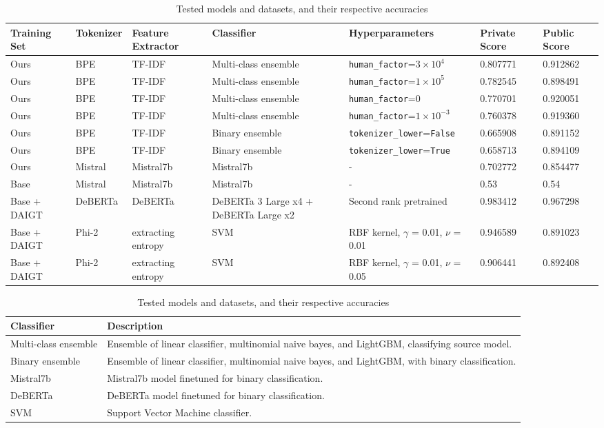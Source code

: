 \documentclass[conference]{IEEEtran}
\begin{document}
\begin{table}[htbp]
  \centering
  \caption{Tested models and datasets, and their respective accuracies}
  \label{tab:models}
  \begin{tabular}{p{1.8cm}p{1.5cm}p{2.3cm}p{2.8cm}p{3.6cm}p{1.6cm}p{1.6cm}}
    \hline
    \textbf{Training Set} & \textbf{Tokenizer} & \textbf{Feature Extractor} & \textbf{Classifier} & \textbf{Hyperparameters} & \textbf{Private Score} & \textbf{Public Score} \\
    \hline
    Ours & BPE & TF-IDF & Multi-class ensemble & \texttt{human\_factor}=$3 \times 10^4$ & 0.807771 & 0.912862 \\
    Ours & BPE & TF-IDF & Multi-class ensemble & \texttt{human\_factor}=$1 \times 10^5$ & 0.782545 & 0.898491 \\
    Ours & BPE & TF-IDF & Multi-class ensemble & \texttt{human\_factor}=$0$ & 0.770701 & 0.920051 \\
    Ours & BPE & TF-IDF & Multi-class ensemble & \texttt{human\_factor}=$1 \times 10^{-3}$ & 0.760378 & 0.919360 \\
    Ours & BPE & TF-IDF & Binary ensemble & \texttt{tokenizer\_lower}=\texttt{False} & 0.665908 & 0.891152 \\
    Ours & BPE & TF-IDF & Binary ensemble & \texttt{tokenizer\_lower}=\texttt{True} & 0.658713 & 0.894109 \\

    Ours & Mistral & Mistral7b & Mistral7b & - & 0.702772 & 0.854477 \\
    Base & Mistral & Mistral7b & Mistral7b & - & 0.53 & 0.54 \\

    Base + DAIGT & DeBERTa & DeBERTa & DeBERTa 3 Large x4 + DeBERTa Large x2 & Second rank pretrained & 0.983412 & 0.967298 \\
    Base + DAIGT & Phi-2 & extracting entropy & SVM & RBF kernel, $\gamma$ = 0.01, $\nu$ = 0.01 & 0.946589 & 0.891023 \\
    Base + DAIGT & Phi-2 & extracting entropy & SVM & RBF kernel, $\gamma$ = 0.01, $\nu$ = 0.05 & 0.906441 & 0.892408 \\

    \hline
  \end{tabular}

  \vspace{0.5cm}

  \begin{tabular}{ll}
    \hline
    \textbf{Classifier} & \textbf{Description} \\
    \hline
    Multi-class ensemble & Ensemble of linear classifier, multinomial naive bayes, and LightGBM, classifying source model. \\
    Binary ensemble & Ensemble of linear classifier, multinomial naive bayes, and LightGBM, with binary classification. \\
    Mistral7b & Mistral7b model finetuned for binary classification. \\
    DeBERTa & DeBERTa model finetuned for binary classification. \\
    SVM & Support Vector Machine classifier. \\
    \hline
  \end{tabular}


\end{table}
\end{document}

